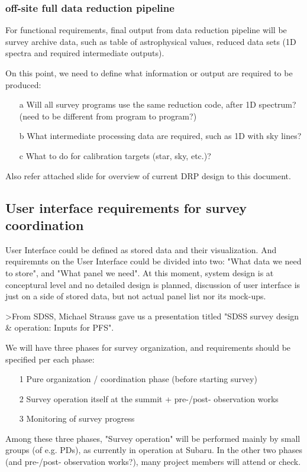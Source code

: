 \documentclass[a4paper,notitlepage]{article}
\begin{document}
\subsubsection{off-site full data reduction pipeline}


For functional requirements, final output from data reduction pipeline will 
be survey archive data, such as table of astrophysical values, reduced data 
sets (1D spectra and required intermediate outputs). 

On this point, we need to define what information or output are required to 
be produced: 
\begin{enumerate}
  \item[a] Will all survey programs use the same reduction code, after 1D spectrum?
    (need to be different from program to program?)
  \item[b] What intermediate processing data are required, such as 1D with sky lines?
  \item[c] What to do for calibration targets (star, sky, etc.)?
\end{enumerate}

Also refer attached slide for overview of current DRP design to this document. 


\subsection{User interface requirements for survey coordination}

User Interface could be defined as stored data and their visualization. And 
requiremnts on the User Interface could be divided into two: 
"What data we need to store", and "What panel we need".
At this moment, system design is at conceptural level and no detailed design 
is planned, discussion of user interface is just on a side of stored data, but 
not actual panel list nor its mock-ups. 

>From SDSS, Michael Strauss gave us a presentation titled "SDSS survey design 
\& operation: Inputs for PFS". 

We will have three phases for survey organization, and requirements should be 
specified per each phase: 
\begin{enumerate}
  \item[1] Pure organization / coordination phase (before starting survey)
  \item[2] Survey operation itself at the summit + pre-/post- observation works
  \item[3] Monitoring of survey progress
\end{enumerate}
Among these three phases, "Survey operation" will be performed mainly by small 
groups (of e.g. PDs), as currently in operation at Subaru. In the other two 
phases (and pre-/post- observation works?), many project members will attend 
or check.
\end{document}
